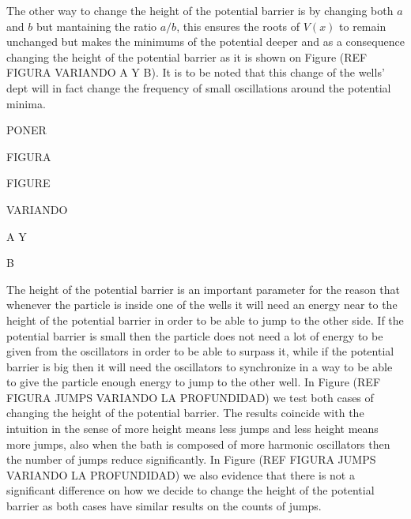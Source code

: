 The other way to change the height of the potential barrier is by changing both $a$ and $b$ but mantaining the ratio $a/b$, this ensures the roots of $V(x)$ to remain unchanged but makes the minimums of the potential deeper and as a consequence changing the height of the potential barrier as it is shown on Figure (REF FIGURA VARIANDO A Y B). It is to be noted that this change of the wells' dept will in fact change the frequency of small oscillations  around the potential minima.

PONER\par 
FIGURA\par 
FIGURE\par 
VARIANDO\par 
A Y\par 
B\par 

The height of the potential barrier is an important parameter for the reason that whenever the particle is inside one of the wells it will need an energy near to the height of the potential barrier in order to be able to jump to the other side. If the potential barrier is small then the particle does not need a lot of energy to be given from the oscillators in order to be able to surpass it, while if the potential barrier is big then it will need the oscillators to synchronize in a way to be able to give the particle enough energy to jump to the other well. In Figure (REF FIGURA JUMPS VARIANDO LA PROFUNDIDAD) we test both cases of changing the height of the potential barrier. The results coincide with the intuition in the sense of more height means less jumps and less height means more jumps, also when the bath is composed of more harmonic oscillators then the number of jumps reduce significantly. In Figure (REF FIGURA JUMPS VARIANDO LA PROFUNDIDAD) we also evidence that there is not a significant difference on how we decide to change the height of the potential barrier as both cases have similar results on the counts of jumps.




